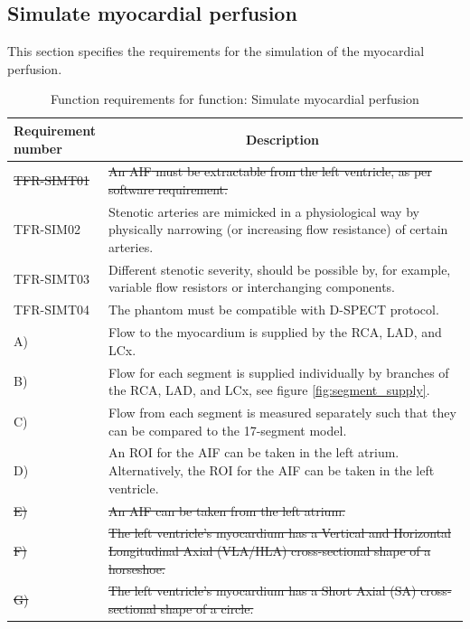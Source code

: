 \subsection{Simulate myocardial perfusion}
This section specifies the requirements for the simulation of the myocardial perfusion.
\begin{table} [H]
\caption{Function requirements for function: Simulate myocardial perfusion}
\label{tab:funcsim}
\begin{tabular}{l|p{120mm}|}
	\makecell[l]{\textbf{Requirement} \\  \textbf{number}} & \multicolumn{1}{c}{\textbf{Description}}\\
	\hline
	\sout{TFR-SIMT01} & \sout{An \ac{AIF} must be extractable from the left ventricle, as per software requirement.}\\
	TFR-SIM02 & Stenotic arteries are mimicked in a physiological way by physically narrowing (or increasing flow resistance) of certain arteries. \\
	TFR-SIMT03 & Different stenotic severity, should be possible by, for example, variable flow resistors or interchanging components. \\
	TFR-SIMT04 & The phantom must be compatible with D-SPECT protocol. \\
	\hspace{1.5cm} A) & Flow to the myocardium is supplied by the RCA, LAD, and LCx. \\
	\hspace{1.5cm} B) & Flow for each segment is supplied individually by branches of the RCA, LAD, and LCx, see figure \ref{fig:segment_supply}. \\
	\hspace{1.5cm} C) & Flow from each segment is measured separately such that they can be compared to the 17-segment model. \\
	\hspace{1.5cm} D) & An ROI for the AIF can be taken in the left atrium. Alternatively, the ROI for the AIF can be taken in the left ventricle. \\
	\hspace{1.5cm} \sout{E)} & \sout{An AIF can be taken from the left atrium.} \\
	\hspace{1.5cm} \sout{F)} & \sout{The left ventricle's myocardium has a Vertical and Horizontal Longitudinal Axial (VLA/HLA) cross-sectional shape of a horseshoe.} \\
	\hspace{1.5cm} \sout{G)} & \sout{The left ventricle's myocardium has a Short Axial (SA) cross-sectional shape of a circle.} \\

\end{tabular}
\end{table}
